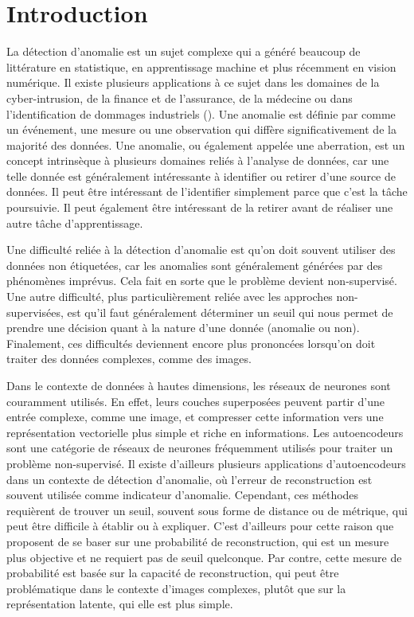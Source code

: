 \chapter*{Introduction}         %
\label{chap:introduction}       %


La détection d'anomalie est un sujet complexe qui a généré beaucoup de littérature en statistique,  en apprentissage machine et plus récemment en vision numérique. Il existe plusieurs applications à ce sujet dans les domaines de la cyber-intrusion, de la finance et de l'assurance, de la médecine ou dans l'identification de dommages industriels (\cite{Chandola07anomalydetection:}). Une anomalie est définie par \cite{Zimek2017} comme un événement, une mesure ou une observation qui diffère significativement de la majorité des données. Une anomalie, ou également appelée une aberration, est un concept intrinsèque à plusieurs domaines reliés à l'analyse de données, car une telle donnée est généralement intéressante à identifier ou retirer d'une source de données. Il peut être intéressant de l'identifier simplement parce que c'est  la tâche poursuivie. Il peut également être intéressant de la retirer avant de réaliser une autre tâche d'apprentissage. \newline

Une difficulté reliée à la détection d'anomalie est qu'on doit souvent utiliser des données non étiquetées, car les anomalies sont généralement générées par des phénomènes imprévus. Cela fait en sorte que le problème devient non-supervisé. Une autre difficulté, plus particulièrement reliée avec les approches non-supervisées, est qu'il faut généralement déterminer un seuil qui nous permet de prendre une décision quant à la nature d'une donnée (anomalie ou non). Finalement, ces difficultés deviennent encore plus prononcées lorsqu'on doit traiter des données complexes, comme des images. \newline

Dans le contexte de données à hautes dimensions, les réseaux de neurones sont couramment utilisés. En effet, leurs couches superposées peuvent partir d'une entrée complexe, comme une image, et compresser cette information vers une représentation vectorielle plus simple et riche en informations. Les autoencodeurs sont une catégorie de réseaux de neurones fréquemment utilisés pour traiter un problème non-supervisé. Il existe d'ailleurs plusieurs applications d'autoencodeurs dans un contexte de détection d'anomalie, où l'erreur de reconstruction est souvent utilisée comme indicateur d'anomalie. Cependant, ces méthodes requièrent de trouver un seuil, souvent sous forme de distance ou de métrique, qui peut être difficile à établir ou à expliquer. C'est d'ailleurs pour cette raison que  \cite{An2015VariationalAB} proposent de se baser sur une probabilité de reconstruction, qui est un mesure plus objective et ne requiert pas de seuil quelconque. Par contre, cette mesure de probabilité est basée sur la capacité de reconstruction, qui peut être problématique dans le contexte d'images complexes, plutôt que sur la représentation latente, qui elle est plus simple.  \newline

